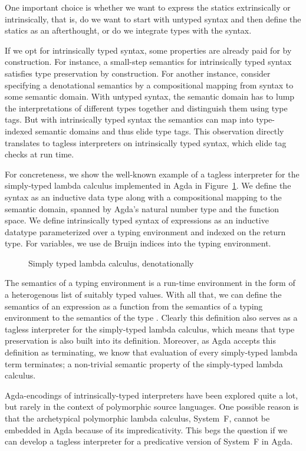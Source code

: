 \documentclass[acmsmall,anonymous,review,screen]{acmart}
\begin{document}
One important choice is whether we want to express the statics
extrinsically or intrinsically, that is, do we want to start with
untyped syntax and then define the statics as an afterthought, or do
we integrate types with the syntax.

If we opt for intrinsically typed syntax, some properties are already paid
for by construction. For instance, a small-step semantics for intrinsically typed
syntax satisfies type preservation by construction. For another
instance, consider specifying a denotational semantics by a
compositional mapping from syntax to some semantic domain. With 
untyped syntax, the semantic domain has to lump the interpretations of
different types together and distinguish them using type tags. But with intrinsically
typed syntax the semantics can map into type-indexed semantic domains
and thus elide type tags. This observation directly translates to tagless interpreters
on intrinsically typed syntax, which elide tag checks at run time.

For concreteness, we show the well-known example of a tagless
interpreter for the simply-typed lambda calculus implemented in Agda in
Figure~\ref{fig:stlc}. We define the syntax as an inductive data type along with
a compositional mapping to the semantic domain, spanned by Agda's
natural number type and the function space. 
We define intrinsically typed syntax of expressions as an inductive datatype
parameterized over a typing environment and indexed on the return
type. For variables, we use de Bruijn indices into the typing
environment.
\begin{figure}[tp]
  
  \caption{Simply typed lambda calculus, denotationally}
  \label{fig:stlc}
\end{figure}

The semantics of a typing environment is a run-time environment in the
form of a heterogenous list of suitably typed values. With all that,
we can define the semantics of an expression {\AESem} as a function from
the semantics of a typing environment {\AGSem} to the semantics of the type
{\ATSem}. Clearly this definition also serves as a tagless interpreter for
the simply-typed lambda calculus, which means that type preservation
is also built into its definition. Moreover, as Agda accepts this
definition as terminating, we know that evaluation of every
simply-typed lambda term terminates; a non-trivial semantic property
of the simply-typed lambda calculus.

Agda-encodings of intrinsically-typed interpreters have been explored
quite a lot, but rarely in the context of polymorphic source
languages. One possible reason is that the archetypical polymorphic
lambda calculus, System~F, cannot be embedded in Agda because of its
impredicativity. This begs the question if we can develop a tagless
interpreter for a predicative version of System~F in Agda.
\end{document}
